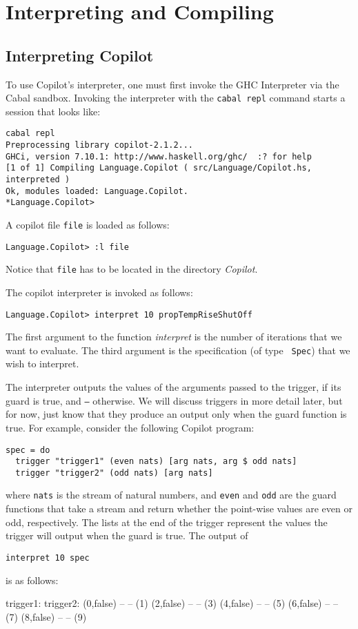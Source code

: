 \section{Interpreting and Compiling}
\label{interpcompile}

\subsection{Interpreting Copilot}
To use Copilot's interpreter, one must first invoke the GHC Interpreter via
the Cabal sandbox. Invoking the interpreter with the \texttt{cabal
repl} command starts a session that looks like: 

%
\begin{lstlisting}[language = Copilot]
cabal repl
Preprocessing library copilot-2.1.2...
GHCi, version 7.10.1: http://www.haskell.org/ghc/  :? for help
[1 of 1] Compiling Language.Copilot ( src/Language/Copilot.hs, interpreted )
Ok, modules loaded: Language.Copilot.
*Language.Copilot> 
\end{lstlisting}
%

A copilot file \texttt{file} is loaded as follows:
%
\begin{lstlisting}[language = Copilot]
Language.Copilot> :l file
\end{lstlisting}

Notice that \texttt{file} has to be located
in the directory \emph{Copilot}.

The copilot interpreter is invoked as follows:
%
\begin{lstlisting}[language = Copilot]
Language.Copilot> interpret 10 propTempRiseShutOff
\end{lstlisting}
%
The first argument to the function \emph{interpret} is the number of iterations
that we want to evaluate. The third argument is the specification (of type {\tt
Spec}) that we wish to interpret.

The interpreter outputs the values of the arguments passed to the trigger, if
its guard is true, and {\tt --} otherwise. We will discuss triggers in more detail later, 
but for now, just know that they produce an output only when the guard function
is true. For example, consider the following
Copilot program:
%
\begin{lstlisting}[language = Copilot]
spec = do
  trigger "trigger1" (even nats) [arg nats, arg $ odd nats]
  trigger "trigger2" (odd nats) [arg nats]
\end{lstlisting}
where {\tt nats} is the stream of natural numbers, and {\tt even} and {\tt odd}
are the guard functions that take a stream and return whether the point-wise values are
even or odd, respectively. The lists at the end of the trigger represent the values the 
trigger will output when the guard is true. The output of
%
\begin{lstlisting}[language = Copilot]
interpret 10 spec
\end{lstlisting}
is as follows:
%
\begin{code}
trigger1:   trigger2:
(0,false)  --
--         (1)
(2,false)  --
--         (3)
(4,false)  --
--         (5)
(6,false)  --
--         (7)
(8,false)  --
--         (9)
\end{code}
%

